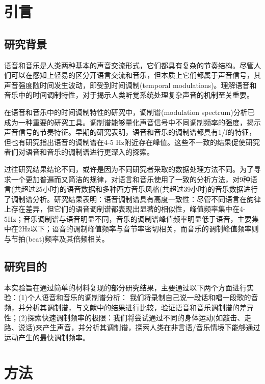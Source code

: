 \documentclass[jou,12pt,floatsintext]{apa7} %
\begin{document}
\section{引言}

\subsection{\heiti 研究背景}
语音和音乐是人类两种基本的声音交流形式，它们都具有复杂的节奏结构。尽管人们可以在感知上轻易的区分开语言交流和音乐，但本质上它们都属于声音信号，其声音强度随时间发生波动，即受到时间调制(temporal modulations)。理解语音和音乐中的时间调制特性，对于揭示人类听觉系统处理复杂声音的机制至关重要。

在语音和音乐中的时间调制特性的研究中，调制谱(modulation spectrum)分析已成为一种重要的研究工具。调制谱能够量化声音信号中不同调制频率的强度，揭示声音信号的节奏特征。早期的研究表明，语音和音乐的调制谱都具有1/f的特征\parencite{voss1975,mozer1996,decoensel2003,singh2003modulation}，但也有研究指出语音的调制谱在4-5 Hz附近存在峰值\parencite{houtgast1985review,chi1999spectro,greenberg1999speaking,greenberg2003temporal,goswami2013speech}。这些不一致的结果促使研究者们对语音和音乐的调制谱进行更深入的探索。

过往研究结果结论不同，或许是因为不同研究者采取的数据处理方法不同。为了寻求一个更加普遍而又简洁的规律，\textcite{ding2017temporal}对语言和音乐使用了一致的分析方法，对9种语言(共超过25小时)的语音数据和多种西方音乐风格(共超过39小时)的音乐数据进行了调制谱分析。研究结果表明：语音调制谱具有高度一致性：尽管不同语言在韵律上存在差异，但它们的语音调制谱都表现出显著的相似性，峰值频率集中在4-5Hz；音乐调制谱与语音明显不同，音乐的调制谱峰值频率明显低于语音，主要集中在2Hz以下；语音的调制峰值频率与音节率密切相关，而音乐的调制峰值频率则与节拍(beat)频率及其倍频相关。

\subsection{\heiti 研究目的}

本实验旨在通过简单的材料复现\textcite{ding2017temporal}的部分研究结果，主要通过以下两个方面进行实验：(1)个人语音和音乐的调制谱分析： 我们将录制自己说一段话和唱一段歌的音频，并分析其调制谱，与文献中的结果进行比较，验证语音和音乐调制谱的差异性；(2)探索快速调制频率的极限：我们将尝试通过不同的身体运动(如敲击、走路、说话)来产生声音，并分析其调制谱，探索人类在非言语/音乐情境下能够通过运动产生的最快调制频率。


\section{方法}
\end{document}
